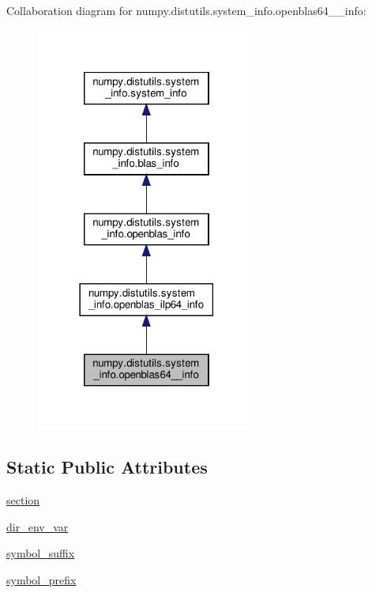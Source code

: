 Collaboration diagram for numpy.\+distutils.\+system\+\_\+info.\+openblas64\+\_\+\+\_\+info\+:
\nopagebreak
\begin{figure}[H]
\begin{center}
\leavevmode
\includegraphics[width=206pt]{classnumpy_1_1distutils_1_1system__info_1_1openblas64____info__coll__graph}
\end{center}
\end{figure}
\subsection*{Static Public Attributes}
\begin{DoxyCompactItemize}
\item 
\hyperlink{classnumpy_1_1distutils_1_1system__info_1_1openblas64____info_a946dabb9a66ef36a0347e012c1cc1ed3}{section}
\item 
\hyperlink{classnumpy_1_1distutils_1_1system__info_1_1openblas64____info_aff647f1341024efd3ad947af6c7f7a35}{dir\+\_\+env\+\_\+var}
\item 
\hyperlink{classnumpy_1_1distutils_1_1system__info_1_1openblas64____info_a175fe499504d066f993832a0ca001755}{symbol\+\_\+suffix}
\item 
\hyperlink{classnumpy_1_1distutils_1_1system__info_1_1openblas64____info_a989d989d11f1f15265a1cadeabff75ef}{symbol\+\_\+prefix}
\end{DoxyCompactItemize}
